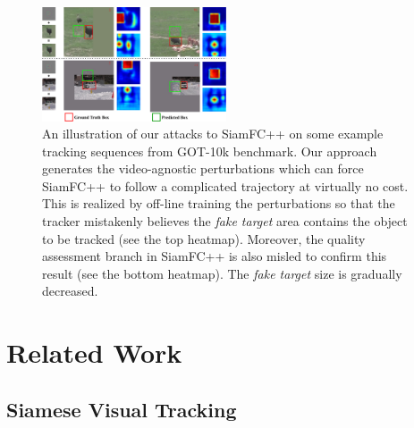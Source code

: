 \documentclass[journal]{IEEEtran}
\begin{document}
\begin{figure}[t]
  \centering
  \includegraphics[width=0.485\textwidth]{images_imperceptible/1_v8.pdf}
  \caption{An illustration of our attacks to SiamFC++ on some example tracking sequences from GOT-10k benchmark. Our approach generates the video-agnostic perturbations which can force SiamFC++ to follow a complicated trajectory at virtually no cost. This is realized by off-line training the perturbations so that the tracker mistakenly believes the \textit{fake target} area contains the object to be tracked (see the top heatmap). Moreover, the quality assessment branch in SiamFC++ is also misled to confirm this result (see the bottom heatmap). The \textit{fake target} size is gradually decreased.} 
  \label{fig:1}
\end{figure}

\section{Related Work}

\subsection{Siamese Visual Tracking}
\end{document}
